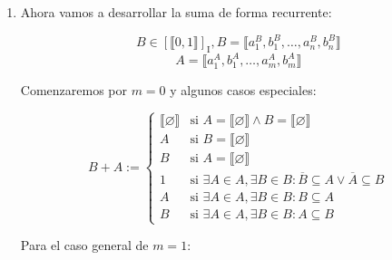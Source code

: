 \begin{enumerate}
\item Ahora vamos a desarrollar la suma de forma recurrente:

\[ B \in \left\lbrack \llbracket 0,1 \rrbracket \right\rbrack_{\mathbf{\mathrm{I}}}, B = \llbracket a_{1}^{B},b_{1}^{B},\ldots,a_{n}^{B},b_{n}^{B} \rrbracket \]
\[ A = \llbracket a_{1}^{A},b_{1}^{A},\ldots,a_{m}^{A},b_{m}^{A} \rrbracket \]

Comenzaremos por $m = 0$ y algunos casos especiales:

\[
B + A := \begin{cases}
  \llbracket \varnothing \rrbracket & \text{si } A = \llbracket \varnothing \rrbracket \land B = \llbracket \varnothing \rrbracket \\
  A & \text{si } B = \llbracket \varnothing \rrbracket \\
  B & \text{si } A = \llbracket \varnothing \rrbracket \\
  1 & \text{si } \exists A \in A, \exists B \in B : \overline{B} \subseteq A \lor \overline{A} \subseteq B \\
  A & \text{si } \exists A \in A, \exists B \in B : B \subseteq A \\
  B & \text{si } \exists A \in A, \exists B \in B : A \subseteq B
\end{cases}
\]

Para el caso general de $m = 1$:


\end{enumerate}
